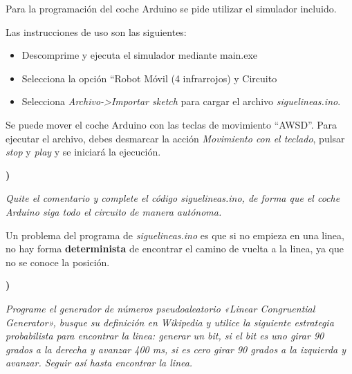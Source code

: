 \documentclass{article}
\newcounter{pregunta}
\newcommand\prop[1]%
{\addtocounter{pregunta}{1}
\noindent%
{\color{naranja_muy}\small\bf\thepregunta)}
\parbox[t]{.95\linewidth}{\it #1}}
\begin{document}
Para la programación del coche Arduino se pide utilizar el simulador incluido.


Las instrucciones de uso son las siguientes:
\begin{itemize}
\item Descomprime y ejecuta el simulador mediante main.exe
\item Selecciona la opción “Robot Móvil (4 infrarrojos) y Circuito
\item Selecciona \emph{Archivo->Importar sketch} para cargar el archivo \emph{siguelineas.ino}.
\end{itemize}

Se puede mover el coche Arduino con las teclas de movimiento “AWSD”. Para ejecutar
el archivo, debes desmarcar la acción \emph{Movimiento con el teclado},
pulsar \emph{stop} y \emph{play}  y se
iniciará la ejecución.

\prop{Quite el comentario y complete el código \emph{siguelineas.ino}, de forma que el coche Arduino siga todo el circuito de manera autónoma.}
\label{sec:org15a69fa}

Un problema del programa de \emph{siguelineas.ino} es que si no empieza en
una linea, no hay forma \textbf{determinista} de encontrar el camino de
vuelta a la linea, ya que no se conoce la posición.

\prop{Programe el generador de números pseudoaleatorio «Linear Congruential Generator», busque su definición en Wikipedia y utilice la siguiente estrategia probabilista para encontrar la linea: generar un bit, si el bit es uno girar 90 grados a la derecha y avanzar 400 ms, si es cero girar 90 grados a la izquierda y avanzar. Seguir así hasta encontrar la linea.}
\label{sec:orgbecb0ad}
\end{document}
